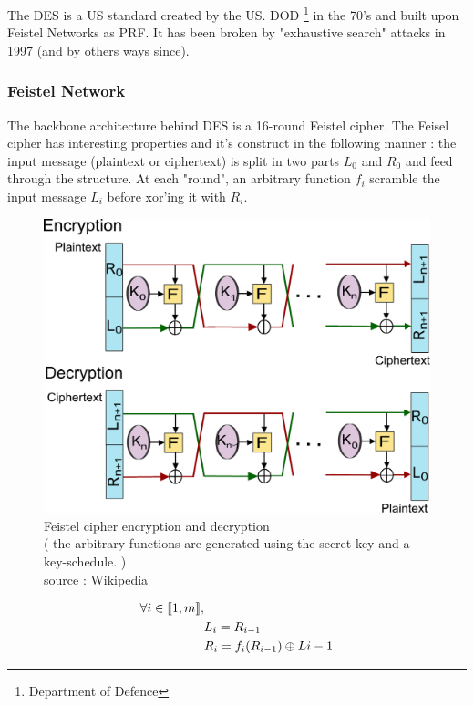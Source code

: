 The DES is a US standard created by the US. DOD \footnote{Department of Defence} in the 70's and built upon Feistel Networks as PRF. It has been broken by "exhaustive search" attacks in 1997 (and by others ways since).

\subsubsection{Feistel Network}

The backbone architecture behind DES is a 16-round Feistel cipher. The Feisel cipher has interesting properties and it's construct in the following manner : the input message (plaintext or ciphertext) is split in two parts $L_0$ and $R_0$ and feed through the structure. At each "round", an arbitrary function $f_i$ scramble the input message $L_i$ before xor'ing it with $R_i$.

\begin{figure}[ht!]
    \centering
       \includegraphics[width=\textwidth]{images/Feistel_cipher_encryption.pdf}
    \caption{Feistel cipher encryption and decryption \\ ( the arbitrary functions are generated using the secret key and a key-schedule. )\\ source : Wikipedia}
	\label{fig:Feistel_cipher}
\end{figure}
 

\begin{mytheorem}
    \begin{align}
        \forall i \in \llbracket1,m\rrbracket,&                 \\
        &L_i = R_{i-1}                                          \\
        &R_i = f_i(R_{i-1}) \oplus L{i-1}                         
    \end{align}
\end{mytheorem}

